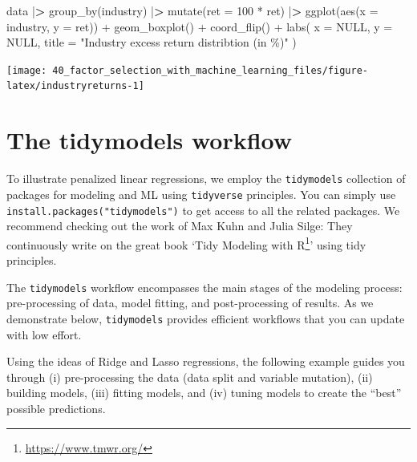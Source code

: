 \documentclass[
]{krantz}
\newenvironment{Shaded}{\begin{snugshade}}{\end{snugshade}}
\newcommand{\AttributeTok}[1]{\textcolor[rgb]{0.61,0.61,0.61}{#1}}
\newcommand{\ConstantTok}[1]{\textcolor[rgb]{0,0,0}{#1}}
\newcommand{\DecValTok}[1]{\textcolor[rgb]{0.06,0.06,0.06}{#1}}
\newcommand{\ErrorTok}[1]{\textcolor[rgb]{0.14,0.14,0.14}{\textbf{#1}}}
\newcommand{\FunctionTok}[1]{\textcolor[rgb]{0,0,0}{#1}}
\newcommand{\NormalTok}[1]{#1}
\newcommand{\SpecialCharTok}[1]{\textcolor[rgb]{0,0,0}{#1}}
\newcommand{\StringTok}[1]{\textcolor[rgb]{0.5,0.5,0.5}{#1}}
\renewcommand{\href}[2]{#2\footnote{\url{#1}}}
\begin{document}
\begin{Shaded}
\begin{Highlighting}[]
\NormalTok{data }\SpecialCharTok{|}\ErrorTok{\textgreater{}}
  \FunctionTok{group\_by}\NormalTok{(industry) }\SpecialCharTok{|}\ErrorTok{\textgreater{}}
  \FunctionTok{mutate}\NormalTok{(}\AttributeTok{ret =} \DecValTok{100} \SpecialCharTok{*}\NormalTok{ ret) }\SpecialCharTok{|}\ErrorTok{\textgreater{}}
  \FunctionTok{ggplot}\NormalTok{(}\FunctionTok{aes}\NormalTok{(}\AttributeTok{x =}\NormalTok{ industry, }\AttributeTok{y =}\NormalTok{ ret)) }\SpecialCharTok{+}
  \FunctionTok{geom\_boxplot}\NormalTok{() }\SpecialCharTok{+}
  \FunctionTok{coord\_flip}\NormalTok{() }\SpecialCharTok{+}
  \FunctionTok{labs}\NormalTok{(}
    \AttributeTok{x =} \ConstantTok{NULL}\NormalTok{, }\AttributeTok{y =} \ConstantTok{NULL}\NormalTok{,}
    \AttributeTok{title =} \StringTok{"Industry excess return distribtion (in \%)"}
\NormalTok{  )}
\end{Highlighting}
\end{Shaded}

\begin{center}\texttt{[image: 40\_factor\_selection\_with\_machine\_learning\_files/figure-latex/industryreturns-1]} \end{center}

\hypertarget{the-tidymodels-workflow}{%
\section{The tidymodels workflow}\label{the-tidymodels-workflow}}

To illustrate penalized linear regressions, we employ the \texttt{tidymodels} collection of packages for modeling and ML using \texttt{tidyverse} principles. You can simply use \texttt{install.packages("tidymodels")} to get access to all the related packages. We recommend checking out the work of Max Kuhn and Julia Silge: They continuously write on the great book `\href{https://www.tmwr.org/}{Tidy Modeling with R}' using tidy principles.

The \texttt{tidymodels} workflow encompasses the main stages of the modeling process: pre-processing of data, model fitting, and post-processing of results. As we demonstrate below, \texttt{tidymodels} provides efficient workflows that you can update with low effort.

Using the ideas of Ridge and Lasso regressions, the following example guides you through (i) pre-processing the data (data split and variable mutation), (ii) building models, (iii) fitting models, and (iv) tuning models to create the ``best'' possible predictions.
\end{document}
